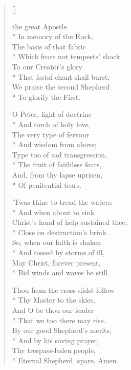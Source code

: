 \newHymn
{}

\begin{verse}[\versewidth]
\begin{altverse}
 the great Apostle\\*
In memory of the Rock,\\
The basis of that fabric\\*
Which fears not tempests' shock.\\
To our Creator's glory\\*
That festal chant shall burst,\\
We praise the second Shepherd\\*
To glorify the First.
\end{altverse}

\begin{altverse}
 O Peter, light of doctrine\\*
And torch of holy love,\\
The very type of fervour\\*
And wisdom from above;\\
Type too of sad transgression,\\*
The fruit of faithless fears,\\
And, from thy lapse uprisen,\\*
Of penitential tears.
\end{altverse}

\begin{altverse}
 'Twas thine to tread the waters;\\*
And when about to sink\\
Christ's hand of help sustained thee,\\*
Close on destruction's brink.\\
So, when our faith is shaken\\*
And tossed by storms of ill,\\
May Christ, forever present,\\*
Bid winds and waves be still.
\end{altverse}

\begin{altverse}
 Thou from the cross didst follow\\*
Thy Master to the skies,\\
And O be thou our leader\\*
That we too there may rise.\\
By our good Shepherd's merits,\\*
And by his saving prayer,\\
Thy trespass-laden people,\\*
Eternal Shepherd, spare. Amen.
\end{altverse}

\end{verse}


